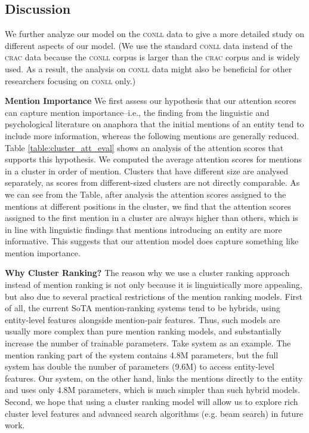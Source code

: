 \documentclass[10pt, a4paper]{article}
\newcommand{\ACRO}[1]{\textsc{#1}}
\newcommand{\CONLL}{\ACRO{conll}}
\newcommand{\CRAC}{\ACRO{crac}}
\begin{document}
\subsection{Discussion}

We further 
analyze our model on the {\CONLL} data to give a more detailed study on different aspects of our model. 
(We use the standard {\CONLL} data instead of the {\CRAC} data because the {\CONLL} corpus is larger than the {\CRAC} corpus and is widely used. 
As a result, the analysis on {\CONLL} data might also be beneficial for 
other researchers focusing on {\CONLL} only.) 

\textbf{Mention Importance} 
We first
assess our hypothesis that our attention scores can capture mention importance--i.e., the finding from the linguistic and psychological literature on anaphora that the initial mentions of an entity tend to include more information, whereas the following mentions are generally reduced. 
Table \ref{table:cluster_att_eval} shows an analysis of the attention scores that supports this hypothesis. 
We computed the average attention scores for mentions in a cluster in order of mention. 
Clusters that have different size are analysed separately, as scores from different-sized clusters are not directly comparable. 
As we can see from the Table, after analysis the attention scores assigned to the mentions at  different positions in the cluster, we find that the attention scores assigned to the first mention in a cluster are always higher than others, which is in line with linguistic findings that mentions introducing an entity are more informative. 
This suggests that our attention model does capture something like mention importance.

\textbf{Why Cluster Ranking?} The reason why we use a cluster ranking approach instead of  mention ranking is not only because it is linguistically more appealing, but also due to several practical restrictions of the mention ranking models. First of all, the current SoTA mention-ranking systems tend to be hybrids, using  entity-level features alongside 
mention-pair features. 
Thus, such models 
are usually more complex 
than pure mention ranking models, 
and substantially
increase the number of trainable parameters. 
Take  system as an example.
The mention ranking part of the system contains 4.8M parameters, but the full system has double the number of parameters  (9.6M) to access entity-level features. 
Our system, on the other hand, links the mentions directly to the entity and uses only 4.8M parameters, which is much simpler than such hybrid  models. 
Second, we hope that using a cluster ranking model 
will allow us to explore rich cluster level features and advanced search algorithms (e.g. beam search) in future work. 
\end{document}
